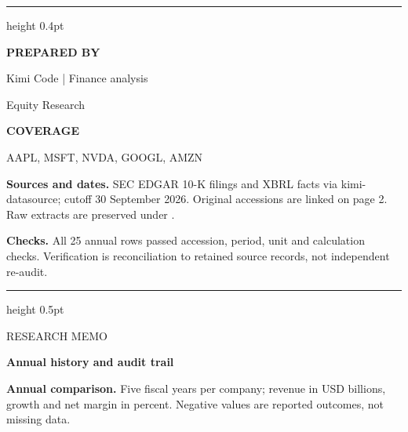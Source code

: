\documentclass[a4paper,10pt]{article}
\newcommand{\ReportType}{RESEARCH MEMO}
\newcommand{\DataDate}{30 September 2026}
\newcommand{\TeamName}{Equity Research}
\newcommand{\ReportAuthor}{Kimi Code | Finance analysis}
\newcommand{\Coverage}{AAPL, MSFT, NVDA, GOOGL, AMZN}
\begin{document}
{\color{MemoRule}\hrule height 0.4pt}\medskip
\begin{minipage}[t]{0.36\textwidth}
\vspace{0pt}\small
\setlength{\parskip}{3pt}
\textbf{PREPARED BY}\par\ReportAuthor\par\TeamName\par
\medskip\textbf{COVERAGE}\par\Coverage
\end{minipage}\hfill
\begin{minipage}[t]{0.60\textwidth}
\vspace{0pt}\footnotesize
\setlength{\parskip}{3pt}
\textbf{Sources and dates.} SEC EDGAR 10-K filings and XBRL facts via kimi-datasource; cutoff \DataDate. Original accessions are linked on page 2. Raw extracts are preserved under .

\textbf{Checks.} All 25 annual rows passed accession, period, unit and calculation checks. Verification is reconciliation to retained source records, not independent re-audit.
\end{minipage}

\clearpage
{\color{MemoBlue}\hrule height 0.5pt}\medskip
{\large\ReportType}\par\smallskip
{\LARGE\bfseries Annual history and audit trail}\par\medskip
\textbf{Annual comparison.} Five fiscal years per company; revenue in USD billions, growth and net margin in percent. Negative values are reported outcomes, not missing data.



\end{document}
